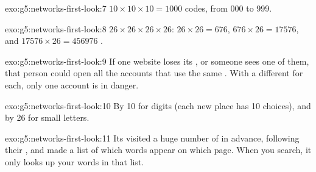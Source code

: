\begin{solution}{exo:g5:networks-first-look:7}
$10 \times 10 \times 10 = \num{1000}$ codes, from 000 to 999.
\end{solution}

\begin{solution}{exo:g5:networks-first-look:8}
$26 \times 26 \times 26 \times 26$: $26 \times 26 = 676$, $676 \times 26 =
\num{17576}$, and $\num{17576} \times 26 = \num{456976}$ .
\end{solution}

\begin{solution}{exo:g5:networks-first-look:9}
If one website loses its , or someone sees one of them, that person
could open all the accounts that use the same . With a different
 for each, only one account is in danger.
\end{solution}

\begin{solution}{exo:g5:networks-first-look:10}
By 10 for digits (each new place has 10 choices), and by 26 for small letters.
\end{solution}

\begin{solution}{exo:g5:networks-first-look:11}
Its  visited a huge number of  in advance, following their
, and made a list of which words appear on which page. When you search, it
only looks up your words in that list.
\end{solution}
